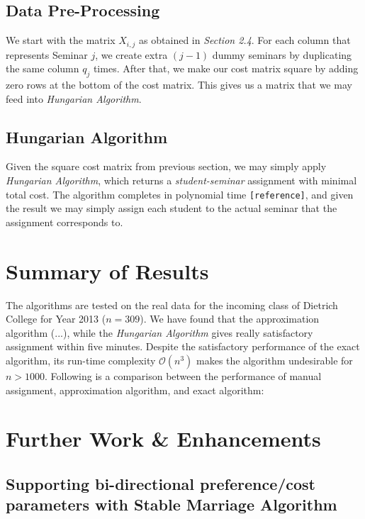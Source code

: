 \documentclass{article} %
\begin{document}
\subsection{Data Pre-Processing}
    \par\qquad We start with the matrix $X_{i,j}$ as obtained in \emph{Section 2.4}. For each column that represents Seminar $j$, we create extra $(j-1)$ dummy seminars by duplicating the same column $q_j$ times. After that, we make our cost matrix square by adding zero rows at the bottom of the cost matrix. This gives us a matrix that we may feed into \emph{Hungarian Algorithm}.

\subsection{Hungarian Algorithm}
    \par\qquad Given the square cost matrix from previous section, we may simply apply \emph{Hungarian Algorithm}, which returns a \emph{student-seminar} assignment with minimal total cost. The algorithm completes in polynomial time \texttt{[reference]}, and given the result we may simply assign each student to the actual seminar that the assignment corresponds to.
%
%
\section{Summary of Results}
    \par The algorithms are tested on the real data for the incoming class of Dietrich College for Year 2013 ($n=309$). We have found that the approximation algorithm (...), while the \emph{Hungarian Algorithm} gives really satisfactory assignment within five minutes. Despite the satisfactory performance of the exact algorithm, its run-time complexity $\mathcal{O}(n^3)$ makes the algorithm undesirable for $n>1000$. Following is a comparison between the performance of manual assignment, approximation algorithm, and exact algorithm:

\section{Further Work \& Enhancements}

\subsection{Supporting bi-directional preference/cost parameters with Stable Marriage Algorithm}
\end{document}
